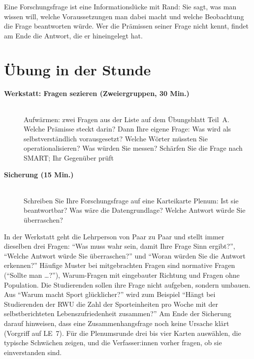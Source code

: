 \begin{merkbox}
Eine Forschungsfrage ist eine Informationslücke mit Rand: Sie sagt, was
man wissen will, welche Voraussetzungen man dabei macht und welche
Beobachtung die Frage beantworten würde. Wer die Prämissen seiner Frage
nicht kennt, findet am Ende die Antwort, die er hineingelegt hat.
\end{merkbox}
\os{\newpage}

\section{Übung in der Stunde}
\begin{description}
\item[{\rot\bf Werkstatt: Fragen sezieren (Zweiergruppen, 30 Min.)}]~\\[-\lblskip]
\bi
  \ite Aufwärmen: zwei Fragen aus der Liste auf dem Übungsblatt Teil~A.
    Welche Prämisse steckt darin?
  \ite Dann Ihre eigene Frage: Was wird als selbstverständlich
    vorausgesetzt?
  \ite Welche Wörter müssten Sie operationalisieren? Was würden Sie
    messen?
  \ite Schärfen Sie die Frage nach SMART; Ihr Gegenüber prüft
\ei
\os{\newpage}

\item[{\rot\bf Sicherung (15 Min.)}]~\\[-\lblskip]
\bi
  \ite Schreiben Sie Ihre Forschungsfrage auf eine Karteikarte
  \ite Plenum: Ist sie beantwortbar? Was wäre die Datengrundlage?
  \ite Welche Antwort würde Sie überraschen?
\ei
\os{\newpage}
\end{description}

\begin{lehrhinweis}
In der Werkstatt geht die Lehrperson von Paar zu Paar und stellt immer
dieselben drei Fragen: \enquote{Was muss wahr sein, damit Ihre Frage Sinn
ergibt?}, \enquote{Welche Antwort würde Sie überraschen?} und
\enquote{Woran würden Sie die Antwort erkennen?} Häufige Muster bei
mitgebrachten Fragen sind normative Fragen (\enquote{Sollte man \dots?}),
Warum-Fragen mit eingebauter Richtung und Fragen ohne Population. Die
Studierenden sollen ihre Frage nicht aufgeben, sondern umbauen. Aus
\enquote{Warum macht Sport glücklicher?} wird zum Beispiel \enquote{Hängt
bei Studierenden der RWU die Zahl der Sporteinheiten pro Woche mit der
selbstberichteten Lebenszufriedenheit zusammen?} Am Ende der Sicherung
darauf hinweisen, dass eine Zusammenhangsfrage noch keine Ursache klärt
(Vorgriff auf LE~7). Für die Plenumsrunde drei bis vier Karten auswählen,
die typische Schwächen zeigen, und die Verfasser:innen vorher fragen, ob
sie einverstanden sind.
\end{lehrhinweis}

